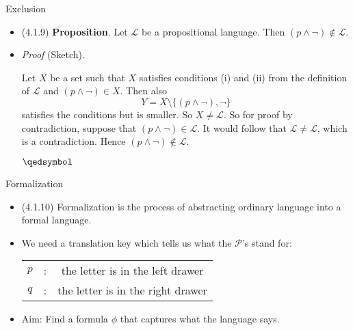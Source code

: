 \documentclass[../slides.tex]{subfiles}
\begin{document}
\begin{frame}{Exclusion}

	\begin{itemize}

		\item (4.1.9) \textbf{Proposition}. Let $\mathcal{L}$ be a propositional language. Then $(p\land \neg)\notin\mathcal{L}$.

		\item \emph{Proof} (Sketch).

		Let $X$ be a set such that $X$ satisfies conditions (i) and (ii) from the definition of $\mathcal{L}$ and $(p\land \neg)\in X$. Then also \[Y=X\setminus \{(p\land \neg), \neg\}\] satisfies the conditions but is smaller. So $X\neq \mathcal{L}$. So for proof by contradiction, suppose that $(p\land \neg)\in\mathcal{L}$. It would follow that $\mathcal{L}\neq\mathcal{L}$, which is a contradiction. Hence $(p\land \neg)\notin\mathcal{L}$. 
		
		\begin{flushright}
		$\qedsymbol$
		\end{flushright}
		

	\end{itemize}

\end{frame}

\begin{frame}{Formalization}

	\begin{itemize}
	
		\item (4.1.10) Formalization is the process of abstracting ordinary language into a formal language.
		
		\item We need a translation key which tells us what the $\mathcal{P}$'s stand for:
		
			\begin{center}
	\begin{tabular}{c c c}
	$p$ & : & the letter is in the left drawer\\
	$q$ & : & the letter is in the right drawer
	\end{tabular}
	\end{center}
	
		\item Aim: Find a formula $\phi$ that captures what the language says. 
	
	\end{itemize}

\end{frame}		
\end{document}
